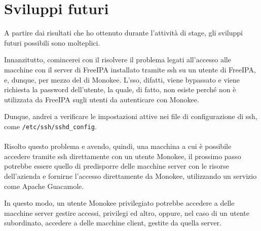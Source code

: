 \section{Sviluppi futuri}
A partire dai risultati che ho ottenuto durante l'attività di stage, gli sviluppi futuri possibili sono molteplici.

Innanzitutto, comincerei con il risolvere il problema legati all'accesso alle macchine con il server di FreeIPA installato tramite \acrshort{ssh} su un utente di FreeIPA, e, dunque, per mezzo del  di Monokee. L'\acrshort{sso}, difatti, viene bypassato e viene richiesta la password dell'utente, la quale, di fatto, non esiste perché non è utilizzata da FreeIPA sugli utenti da autenticare con Monokee. 

Dunque, andrei a verificare le impostazioni attive nei file di configurazione di \acrshort{ssh}, come \texttt{/etc/ssh/sshd\_config}.
\\ \\
Risolto questo problema e avendo, quindi, una macchina a cui è possibile accedere tramite \acrshort{ssh} direttamente con un utente Monokee, il prossimo passo potrebbe essere quello di predisporre delle macchine server con le risorse dell'azienda e fornirne l'accesso 
direttamente da Monokee, utilizzando un servizio come Apache Guacamole.

In questo modo, un utente Monokee privilegiato potrebbe accedere a delle macchine server gestire accessi, privilegi ed altro, oppure, nel caso di un utente subordinato, accedere a delle macchine client, gestite da quella server.